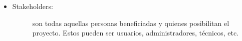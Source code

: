 \begin{itemize}
    \item   \begin{description}
                \item[Stakeholders:] son todas aquellas personas beneficiadas y quienes posibilitan el proyecto. Estos pueden ser usuarios, administradores, técnicos, etc.
            \end{description}  
\end{itemize}
